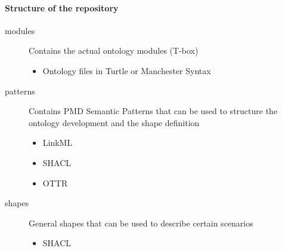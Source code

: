 \paragraph{Structure of the repository}

\begin{description}
    \item[modules] Contains the actual ontology modules (T-box)
    \begin{itemize}
        \item Ontology files in Turtle or Manchester Syntax
    \end{itemize}
    \item[patterns] Contains PMD Semantic Patterns that can be used to structure the ontology development and the shape definition
    \begin{itemize}
        \item LinkML
        \item SHACL
        \item OTTR
    \end{itemize}
    \item[shapes] General shapes that can be used to describe certain scenarios
    \begin{itemize}
        \item SHACL
    \end{itemize}
\end{description}
